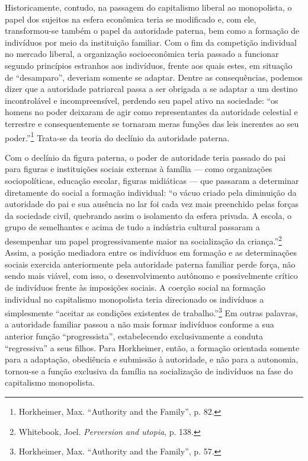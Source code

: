 Historicamente, contudo, na passagem do capitalismo liberal ao
monopolista, o papel dos sujeitos na esfera econômica teria se
modificado e, com ele, transformou-se também o papel da autoridade
paterna, bem como a formação de indivíduos por meio da instituição
familiar. Com o fim da competição individual no mercado liberal, a
organização socioeconômica teria passado a funcionar segundo princípios
estranhos aos indivíduos, frente aos quais estes, em situação de
``desamparo'', deveriam somente se adaptar. Dentre as consequências,
podemos dizer que a autoridade patriarcal passa a ser obrigada a se
adaptar a um destino incontrolável e incompreensível, perdendo seu papel
ativo na sociedade: ``os homens no poder deixaram de agir como
representantes da autoridade celestial e terrestre e consequentemente se
tornaram meras funções das leis inerentes ao seu poder.''\footnote{Horkheimer,
  Max. ``Authority and the Family'', p. 82.} Trata-se da teoria do
declínio da autoridade paterna.

Com o declínio da figura paterna, o poder de autoridade teria passado do
pai para figuras e instituições sociais externas à família --- como
organizações sociopolíticas, educação escolar, figuras midiáticas --- que
passaram a determinar diretamente do social a formação individual: ``o
vácuo criado pela diminuição da autoridade do pai e sua ausência no lar
foi cada vez mais preenchido pelas forças da sociedade civil, quebrando
assim o isolamento da esfera privada. A escola, o grupo de semelhantes e
acima de tudo a indústria cultural passaram a desempenhar um papel
progressivamente maior na socialização da criança.''\footnote{Whitebook,
  Joel. \emph{Perversion and utopia}, p. 138.} Assim, a posição
mediadora entre os indivíduos em formação e as determinações sociais
exercida anteriormente pela autoridade paterna familiar perde força, não
sendo mais viável, com isso, o desenvolvimento autônomo e possivelmente
crítico de indivíduos frente às imposições sociais. A coerção social na
formação individual no capitalismo monopolista teria direcionado os
indivíduos a simplesmente ``aceitar as condições existentes de
trabalho.''\footnote{Horkheimer, Max. ``Authority and the Family'', p.
  57.} Em outras palavras, a autoridade familiar passou a não mais
formar indivíduos conforme a sua anterior função ``progressista'',
estabelecendo exclusivamente a conduta ``regressiva'' a seus filhos.
Para Horkheimer, então, a formação orientada somente para a adaptação,
obediência e submissão à autoridade, e não para a autonomia, tornou-se a
função exclusiva da família na socialização de indivíduos na fase do
capitalismo monopolista.

